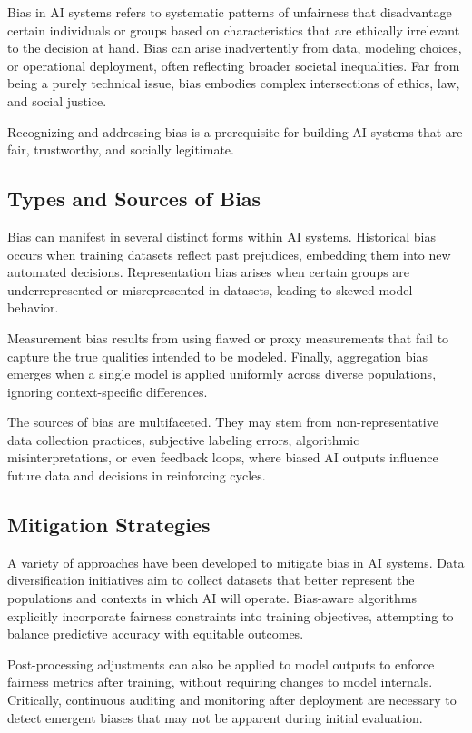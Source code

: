 \documentclass[openany]{book}
\begin{document}
Bias in AI systems refers to systematic patterns of unfairness that disadvantage
certain individuals or groups based on characteristics that are ethically
irrelevant to the decision at hand. Bias can arise inadvertently from data,
modeling choices, or operational deployment, often reflecting broader societal
inequalities. Far from being a purely technical issue, bias embodies complex
intersections of ethics, law, and social justice.

Recognizing and addressing bias is a prerequisite for building AI systems that
are fair, trustworthy, and socially legitimate.

\subsection{Types and Sources of Bias}

Bias can manifest in several distinct forms within AI systems. Historical bias
occurs when training datasets reflect past prejudices, embedding them into new
automated decisions. Representation bias arises when certain groups are
underrepresented or misrepresented in datasets, leading to skewed model
behavior.

Measurement bias results from using flawed or proxy measurements that fail to
capture the true qualities intended to be modeled. Finally, aggregation bias
emerges when a single model is applied uniformly across diverse populations,
ignoring context-specific differences.

The sources of bias are multifaceted. They may stem from non-representative
data collection practices, subjective labeling errors, algorithmic
misinterpretations, or even feedback loops, where biased AI outputs influence
future data and decisions in reinforcing cycles.

\subsection{Mitigation Strategies}

A variety of approaches have been developed to mitigate bias in AI systems.
Data diversification initiatives aim to collect datasets that better represent
the populations and contexts in which AI will operate. Bias-aware algorithms
explicitly incorporate fairness constraints into training objectives, attempting
to balance predictive accuracy with equitable outcomes.

Post-processing adjustments can also be applied to model outputs to enforce
fairness metrics after training, without requiring changes to model internals.
Critically, continuous auditing and monitoring after deployment are necessary
to detect emergent biases that may not be apparent during initial evaluation.
\end{document}

